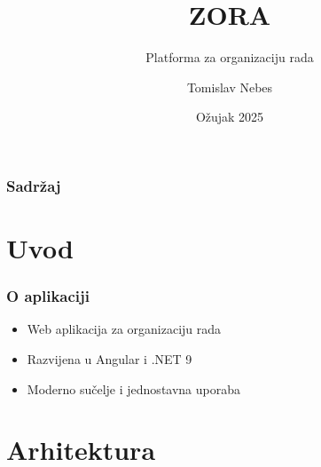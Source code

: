 \documentclass[aspectratio=169]{beamer}
\title{ZORA}
\subtitle{Platforma za organizaciju rada}
\author{Tomislav Nebes}
\date{Ožujak 2025}
\begin{document}
\begin{frame}
    \titlepage
\end{frame}

\begin{frame}
    \frametitle{Sadržaj}
    \tableofcontents
\end{frame}

\section{Uvod}

\begin{frame}
    \frametitle{O aplikaciji}
    \begin{itemize}
        \item Web aplikacija za organizaciju rada
        \item Razvijena u Angular i .NET 9
        \item Moderno sučelje i jednostavna uporaba
    \end{itemize}
\end{frame}

\section{Arhitektura}
\end{document}

